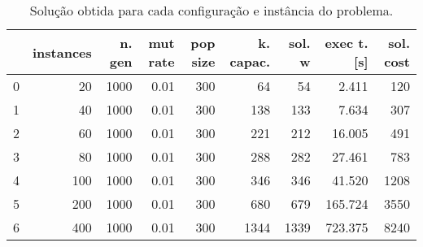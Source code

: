 \documentclass{article}
\begin{document}
\begin{table}
\centering
\begin{tabular}{lrrrrrrrr}
\toprule
{} &  instances &  n. gen &  mut rate &  pop size &  k. capac. &  sol. w &  exec t. [s] &  sol. cost \\
\midrule
0 &         20 &    1000 &      0.01 &       300 &         64 &      54 &        2.411 &        120 \\
1 &         40 &    1000 &      0.01 &       300 &        138 &     133 &        7.634 &        307 \\
2 &         60 &    1000 &      0.01 &       300 &        221 &     212 &       16.005 &        491 \\
3 &         80 &    1000 &      0.01 &       300 &        288 &     282 &       27.461 &        783 \\
4 &        100 &    1000 &      0.01 &       300 &        346 &     346 &       41.520 &       1208 \\
5 &        200 &    1000 &      0.01 &       300 &        680 &     679 &      165.724 &       3550 \\
6 &        400 &    1000 &      0.01 &       300 &       1344 &    1339 &      723.375 &       8240 \\
\bottomrule
\end{tabular}
\caption{Solução obtida para cada configuração e instância do problema.}
\label{table:all-data}
\end{table}
\end{document}
